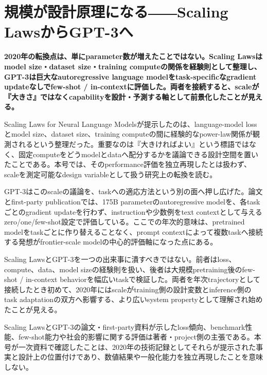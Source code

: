 \section{規模が設計原理になる――Scaling LawsからGPT-3へ}
\label{pkg:scale-laws-gpt3}
\noindent\textbf{2020年の転換点は、単にparameter数が増えたことではない。Scaling Lawsはmodel size・dataset size・training computeの関係を経験則として整理し、GPT-3は巨大なautoregressive language modelをtask-specificなgradient updateなしでfew-shot / in-contextに評価した。両者を接続すると、scaleが『大きさ』ではなくcapabilityを設計・予測する軸として前景化したことが見える。}\autocite{src-0fc45aa25dc7,src-7a3002b6ab1d,src-8f27ffb5bc66}

Scaling Laws for Neural Language Modelsが提示したのは、language-model lossとmodel size、dataset size、training computeの間に経験的なpower-law関係が観測されるという整理だった。重要なのは『大きければよい』という標語ではなく、固定computeをどうmodelとdataへ配分するかを議論できる設計空間を置いたことである。本号では、そのperformance評価を独立再現したとは扱わず、scaleを測定可能なdesign variableとして扱う研究上の転換を読む。\autocite{src-7a3002b6ab1d}


GPT-3はこのscaleの議論を、taskへの適応方法という別の面へ押し広げた。論文とfirst-party publicationでは、175B parameterのautoregressive modelを、各taskごとのgradient updateを行わず、instructionや少数例をtext contextとして与えるzero/one/few-shot設定で評価している。ここでの年次的意味は、pretrained modelをtaskごとに作り替えることなく、prompt contextによって複数taskへ接続する発想がfrontier-scale modelの中心的評価軸になった点にある。\autocite{src-0fc45aa25dc7,src-8f27ffb5bc66}


Scaling LawsとGPT-3を一つの出来事に潰すべきではない。前者はloss、compute、data、model sizeの経験則を扱い、後者は大規模pretraining後のfew-shot / in-context behaviorを幅広いtaskで検証した。両者を年次trajectoryとして接続したとき初めて、2020年にはscaleがtraining側の設計変数とinference側のtask adaptationの双方へ影響する、より広いsystem propertyとして理解され始めたことが見える。\autocite{src-0fc45aa25dc7,src-7a3002b6ab1d,src-8f27ffb5bc66}


\begin{claimboundary}
Scaling LawsとGPT-3の論文・first-party資料が示したloss傾向、benchmark性能、few-shot能力や社会的影響に関する評価は著者・project側の主張である。本号が一次資料で確認したことは、2020年の技術記録としてそれらが提示された事実と設計上の位置付けであり、数値結果や一般化能力を独立再現したことを意味しない。\autocite{src-0fc45aa25dc7,src-7a3002b6ab1d,src-8f27ffb5bc66}
\end{claimboundary}
